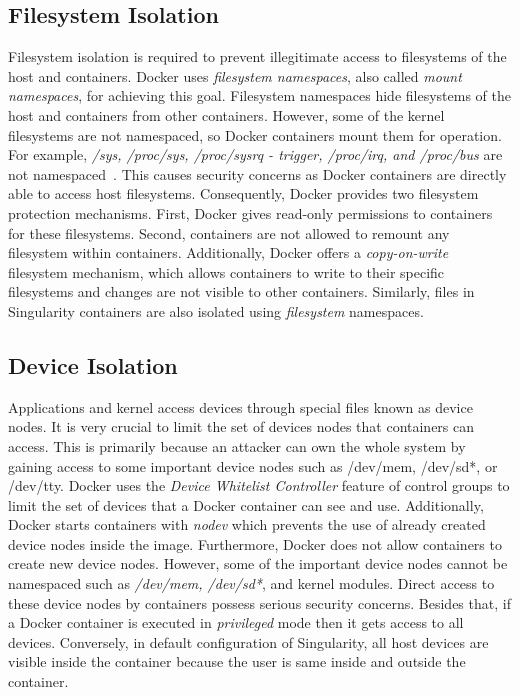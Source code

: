 \subsection{Filesystem Isolation}

Filesystem isolation is required to prevent illegitimate access
to filesystems of the host and containers. Docker uses
\textit{filesystem namespaces}, also called \textit{mount namespaces},
for achieving this goal. Filesystem namespaces hide filesystems of
the host and containers from other containers. However, some of the
kernel filesystems are not namespaced, so Docker containers mount
them for operation. For example, \textit{/sys, /proc/sys,
/proc/sysrq - trigger, /proc/irq, and /proc/bus} are
not namespaced~\cite{walsh}.
This causes security concerns as Docker containers are directly
able to access host filesystems. Consequently, Docker provides
two filesystem protection mechanisms. First, Docker gives
read-only permissions to containers for these filesystems. Second,
containers are not allowed to remount any filesystem within containers.
Additionally, Docker offers a \textit{copy-on-write} filesystem mechanism,
which allows containers to write to their specific filesystems and changes
are not visible to other containers.
Similarly, files in Singularity containers are also isolated using
\textit{filesystem} namespaces.

\subsection{Device Isolation}

Applications and kernel access devices through special files
known as device nodes. It is very crucial to limit the set
of devices nodes that containers can access. This is primarily
because an attacker can own the whole system by gaining access
to some important device nodes such as /dev/mem, /dev/sd*,
or /dev/tty. Docker uses the \textit{Device Whitelist Controller}
\cite{whitelistController} feature of control groups to limit the
set of devices that a Docker container can see and use.
Additionally, Docker starts containers with \textit{nodev} which
prevents the use of already created device nodes inside the image.
Furthermore, Docker does not allow containers to create new device
nodes. However, some of the important device nodes cannot be
namespaced such as \textit{/dev/mem, /dev/sd*}, and kernel modules.
Direct access to these device nodes by containers possess serious
security concerns. Besides that, if a Docker container is executed
in \textit{privileged} mode then it gets access to all devices.
Conversely, in default configuration of Singularity, all host devices
are visible inside the container because the user is same inside and
outside the container.


